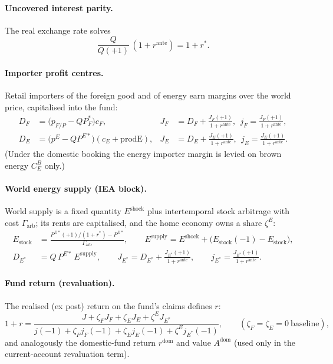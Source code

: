 \documentclass[11pt]{article}
\newcommand{\pE}{p^{E}}
\begin{document}
\paragraph{Uncovered interest parity.} The real exchange rate solves
\begin{equation}
\frac{Q}{Q(+1)}\,(1+r^{\text{ante}})=1+r^{*}. \label{eq:uip}
\end{equation}

\paragraph{Importer profit centres.} Retail importers of the foreign good and of
energy earn margins over the world price, capitalised into the fund:
\begin{align}
D_F &= \bigl(p_{F/P}-Q P^{*}_{F}\bigr)c_F, & J_F&=D_F+\frac{J_F(+1)}{1+r^{\text{ante}}},\ \ j_F=\frac{J_F(+1)}{1+r^{\text{ante}}},\\
D_E &= \bigl(\pE-Q P^{E*}\bigr)(c_E+\mathrm{prodE}), & J_E&=D_E+\frac{J_E(+1)}{1+r^{\text{ante}}},\ \ j_E=\frac{J_E(+1)}{1+r^{\text{ante}}}.
\end{align}
(Under the domestic booking the energy importer margin is levied on brown energy
$C^{B}_{E}$ only.)

\paragraph{World energy supply (IEA block).} World supply is a fixed quantity
$E^{\text{shock}}$ plus intertemporal stock arbitrage with cost $\Gamma_{\text{arb}}$;
its rents are capitalised, and the home economy owns a share $\zeta^{E}$:
\begin{align}
E_{\text{stock}} &= \frac{P^{E*}(+1)/(1+r^{*})-P^{E*}}{\Gamma_{\text{arb}}},\qquad
E^{\text{supply}} = E^{\text{shock}}+\bigl(E_{\text{stock}}(-1)-E_{\text{stock}}\bigr),\\
D_{E^{*}} &= Q\,P^{E*}\,E^{\text{supply}},\qquad
J_{E^{*}}=D_{E^{*}}+\frac{J_{E^{*}}(+1)}{1+r^{\text{ante}}},\qquad
j_{E^{*}}=\frac{J_{E^{*}}(+1)}{1+r^{\text{ante}}}.
\end{align}

\paragraph{Fund return (revaluation).} The realised (ex post) return on the
fund's claims defines $r$:
\begin{equation}
1+r=\frac{J+\zeta_F J_F+\zeta_E J_E+\zeta^{E}J_{E^{*}}}
{j(-1)+\zeta_F j_F(-1)+\zeta_E j_E(-1)+\zeta^{E}j_{E^{*}}(-1)},
\qquad (\zeta_F=\zeta_E=0\ \text{baseline}),
\end{equation}
and analogously the domestic-fund return $r^{\text{dom}}$ and value $A^{\text{dom}}$
(used only in the current-account revaluation term).
\end{document}
